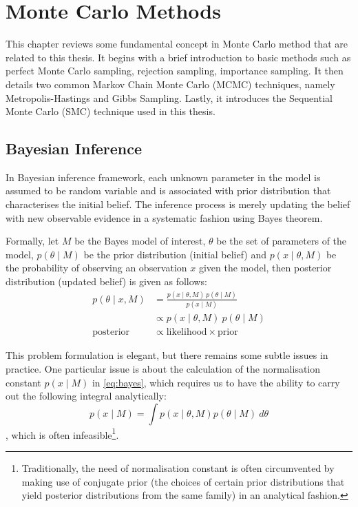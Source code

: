 \chapter{Monte Carlo Methods}
\graphicspath{{Chapter2/figures/}}
\label{ch:mcmethods}
This chapter reviews some fundamental concept in Monte Carlo method that are related to this thesis. It begins with a brief introduction to basic methods such as perfect Monte Carlo sampling, rejection sampling, importance sampling. It then details two common Markov Chain Monte Carlo (MCMC) techniques, namely Metropolis-Hastings and Gibbs Sampling. Lastly, it introduces the Sequential Monte Carlo (SMC) technique used in this thesis.

\section{Bayesian Inference}
In Bayesian inference framework, each unknown parameter in the model is assumed to be random variable and is  associated with prior distribution that characterises the initial belief. The inference process is merely updating the belief with new observable evidence in a systematic fashion using Bayes theorem.

Formally, let $M$ be the Bayes model of interest, $\theta$ be the set of parameters of the model, $p(\theta \mid M)$ be the prior distribution (initial belief) and $p(x \mid \theta, M)$ be the probability of observing an observation $x$ given the model, then posterior distribution (updated belief) is given as follows:  
\begin{align}
  p(\theta \mid x , M) &= \frac{p(x \mid \theta , M)~p(\theta \mid M)}{p(x \mid M)} \nonumber \\
                   &\propto p(x \mid \theta , M)~p(\theta \mid M) \label{eq:bayes} \\
  \text{posterior} &\propto \text{likelihood} \times \text{prior}
\end{align}

This problem formulation is elegant, but there remains some subtle issues in practice. One particular issue is about the calculation of the normalisation constant $p(x \mid M)$ in \eqref{eq:bayes}, which requires us to have the ability to carry out the following integral analytically:
\begin{equation}
  p(x \mid M) = \int p(x \mid \theta, M) p(\theta \mid M)~d\theta
\end{equation}
, which is often infeasible\footnote{Traditionally, the need of normalisation constant is often circumvented by making use of conjugate prior (the choices of certain prior distributions that yield posterior distributions from the same family) in an analytical fashion.}.

